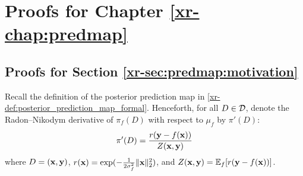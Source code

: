 \documentclass[12pt, twoside]{report}
\newcommand{\xrprefix}[1]{xr-#1}
\begin{document}
\chapter
    {Proofs for Chapter \ref{\xrprefix{chap:predmap}}}
\label{app:proofs_predmap}

\section{Proofs for Section \ref{\xrprefix{sec:predmap:motivation}}}
\label{sec:proofs_predmap:motivation}


Recall the definition of the posterior prediction map in \cref{\xrprefix{def:posterior_prediction_map_formal}}.
Henceforth, for all $D \in \mathcal{D}$, denote the Radon--Nikodym derivative of $\pi_f(D)$ with respect to $\mu_f$ by $\pi'(D)$:
\begin{equation}
    \pi'(D) = \frac
        {r(\mathbf{y} - f(\mathbf{x}))}
        {Z(\mathbf{x}, \mathbf{y})}
\end{equation}
where $D = (\mathbf{x}, \mathbf{y})$,
$r(\mathbf{x}) = \exp({-\tfrac{1}{2\sigma_f^2}\lVert\mathbf{x}\rVert_2^2})$,
and $Z(\mathbf{x}, \mathbf{y}) = \mathbb{E}_f[r(\mathbf{y} - f(\mathbf{x}))]$.
\end{document}

